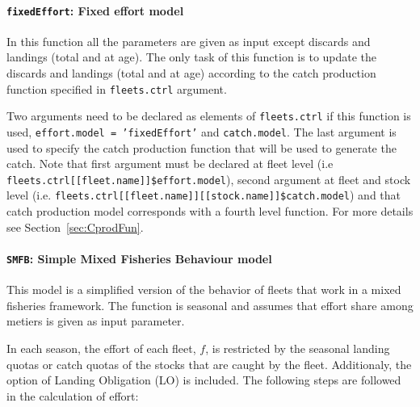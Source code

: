 \paragraph{\texttt{fixedEffort}: Fixed effort model} \hspace{0pt} \smallskip

	  In this function all the parameters are given as input except discards and landings 
	(total and at age). The only task of this function is to update the discards and landings (total and at age)
	according to the catch production function specified in \texttt{fleets.ctrl} argument.
		
	Two arguments need to be declared as elements of \texttt{fleets.ctrl} if this function is used, \texttt{effort.model = 'fixedEffort'} 
	and \texttt{catch.model}. The last argument is used to specify the catch production function that will be used to generate the catch. 
  Note that first argument must be declared at fleet level (i.e \texttt{fleets.ctrl[[fleet.name]]\$effort.model}), 
  second argument at fleet and stock level (i.e. \texttt{fleets.ctrl[[fleet.name]][[stock.name]]\$catch.model})
	and that catch production model corresponds with a fourth level function. For more details see Section~\ref{sec:CprodFun}.
		
		
\paragraph{\texttt{SMFB}: Simple Mixed Fisheries Behaviour model} \hspace{0pt} \smallskip

		This model is a simplified version of the behavior of fleets that work in a 
	mixed fisheries framework. The function is seasonal and assumes that effort share among metiers is
	given as input parameter.
	 
	In each season, the effort of each fleet, $f$, is restricted by the seasonal landing quotas or catch quotas
	of the stocks that are caught by the fleet. Additionaly, the option of Landing Obligation (LO) is included. 
	The following steps are followed in the calculation of effort:
	

